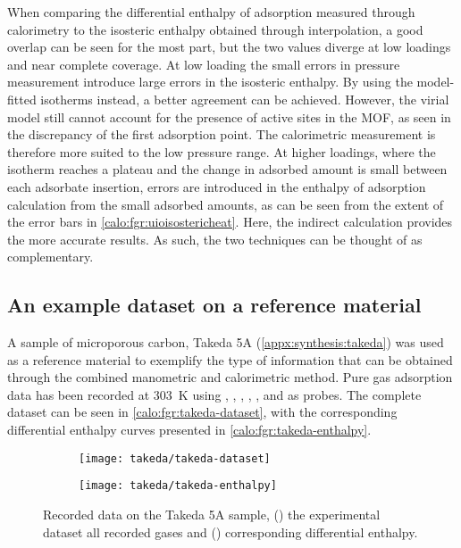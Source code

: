 When comparing the differential enthalpy of adsorption measured through
calorimetry to the isosteric enthalpy obtained through interpolation, 
a good overlap can be seen for the most part, but the two values
diverge at low loadings and near complete coverage. 
At low loading the small errors in pressure measurement introduce
large errors in the isosteric enthalpy. By using the model-fitted 
isotherms instead, a better agreement can be achieved. However, the 
virial model still cannot account for the presence of active sites in the 
MOF, as seen in the discrepancy of the first adsorption point.
The calorimetric measurement is therefore more suited to the low pressure
range. At higher loadings, where the isotherm reaches a plateau and
the change in adsorbed amount is small between each adsorbate
insertion, errors are introduced in the enthalpy of adsorption 
calculation from the small adsorbed amounts, as can be seen from the
extent of the error bars in \autoref{calo:fgr:uioisostericheat}.
Here, the indirect calculation provides the more accurate results.
As such, the two techniques can be thought of as complementary.

\subsection{An example dataset on a reference material}

A sample of microporous carbon, Takeda 5A (\autoref{appx:synthesis:takeda})
was used as a reference material to exemplify the type of information
that can be obtained through the combined manometric and 
calorimetric method. Pure gas adsorption data has been recorded at 
\SI{303}{\kelvin} using , , , , ,
 and  as probes. The complete dataset can be seen 
in \autoref{calo:fgr:takeda-dataset}, with the corresponding differential 
enthalpy curves presented in \autoref{calo:fgr:takeda-enthalpy}.

\begin{figure}[ht]

	\centering
	\begin{subfigure}[b]{.45\textwidth}
		\centering
		\texttt{[image: takeda/takeda-dataset]}
		\caption{}%
		\label{calo:fgr:takeda-dataset}
	\end{subfigure}%
	\quad
	\begin{subfigure}[b]{.45\textwidth}
		\centering
		\texttt{[image: takeda/takeda-enthalpy]}
		\caption{}%
		\label{calo:fgr:takeda-enthalpy}
	\end{subfigure}
	\caption{Recorded data on the Takeda 5A sample, 
		(\protect{}) the
		experimental dataset all recorded gases and 
		(\protect{}) 
		corresponding differential enthalpy.}%
	\label{calo:fgr:takeda-data}

\end{figure}

